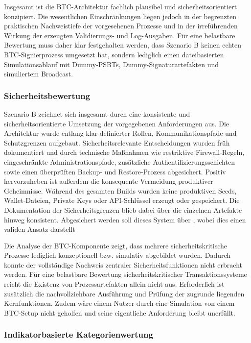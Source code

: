 Insgesamt ist die \ac{BTC}-Architektur fachlich plausibel und sicherheitsorientiert konzipiert. Die wesentlichen Einschränkungen liegen jedoch in der begrenzten praktischen Nachweistiefe der vorgesehenen Prozesse und in der irreführenden Wirkung der erzeugten Validierungs- und Log-Ausgaben. Für eine belastbare Bewertung muss daher klar festgehalten werden, dass Szenario B keinen echten \ac{BTC}-Signierprozess umgesetzt hat, sondern lediglich einen dateibasierten Simulationsablauf mit Dummy-\acp{PSBT}, Dummy-Signaturartefakten und simuliertem Broadcast.


\subsubsection{Sicherheitsbewertung}

Szenario B zeichnet sich insgesamt durch eine konsistente und sicherheitsorientierte Umsetzung der vorgegebenen Anforderungen aus. 
Die Architektur wurde entlang klar definierter Rollen, Kommunikationspfade und Schutzgrenzen aufgebaut. Sicherheitsrelevante Entscheidungen wurden früh dokumentiert und durch technische Maßnahmen wie restriktive Firewall-Regeln, eingeschränkte Administrationspfade, zusätzliche Authentifizierungsschichten sowie einen überprüften Backup- und Restore-Prozess abgesichert. 
Positiv hervorzuheben ist außerdem die konsequente Vermeidung produktiver Geheimnisse. Während des gesamten Builds wurden keine produktiven Seeds, Wallet-Dateien, Private Keys oder \ac{API}-Schlüssel erzeugt oder gespeichert. Die Dokumentation der Sicherheitsgrenzen blieb dabei über die einzelnen Artefakte hinweg konsistent.
Abgesichert werden soll dieses System über , wobei dies einen validen Ansatz darstellt

Die Analyse der \ac{BTC}-Komponente zeigt, dass mehrere sicherheitskritische Prozesse lediglich konzeptionell bzw. simulativ abgebildet wurden. Dadurch konnte der vollständige Nachweis zentraler Sicherheitsfunktionen nicht erbracht werden. 
Für eine belastbare Bewertung sicherheitskritischer Transaktionssysteme reicht die Existenz von Prozessartefakten allein nicht aus. Erforderlich ist zusätzlich die nachvollziehbare Ausführung und Prüfung der zugrunde liegenden Kernfunktionen.
Zudem wäre einem Nutzer durch eine Simulation von einem \ac{BTC}-Setup nicht geholfen und seine eigentliche Anforderung bleibt unerfüllt.

\subsubsection{Indikatorbasierte Kategorienwertung}

